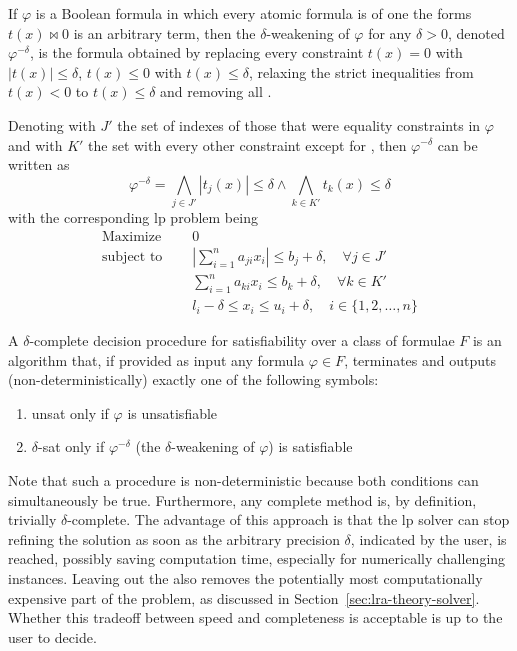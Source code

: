 \documentclass[runningheads]{llncs}
\begin{document}
\begin{definition}
    If $\varphi$ is a Boolean formula in which every atomic formula is of one the forms $t(x) \bowtie 0$ is an arbitrary term, then the $\delta$-weakening of $\varphi$ for any $\delta > 0$, denoted $\varphi^{-\delta}$, is the formula obtained by replacing every constraint $t(x) = 0$ with $|t(x)| \le \delta$, $t(x) \le 0$ with $t(x) \le \delta$, relaxing the strict inequalities from $t(x) < 0$ to $t(x) \le \delta$ and removing all \nqcs.
\end{definition}
Denoting with $J'$ the set of indexes of those that were equality constraints in $\varphi$ and with $K'$ the set with every other constraint except for \nqcs, then $\varphi^{-\delta}$ can be written as
\begin{equation*}
    \varphi^{-\delta} = \bigwedge_{j \in J'} |t_j(x)| \le \delta \wedge \bigwedge_{k \in K'} t_k(x) \le \delta
\end{equation*}
with the corresponding \gls{lp} problem being
\begin{equation}
    \label{eq:delta-lp}
    \begin{split}
        \text{Maximize }   \quad & 0                                                                                \\
        \text{subject to } \quad & \left|\sum_{i=1}^{n} a_{ji}x_{i}\right| \le b_j + \delta, \quad \forall j \in J' \\
        \quad                    & \sum_{i=1}^{n} a_{ki}x_{i} \le b_k + \delta, \quad \forall k \in K'              \\
        \quad                    & l_i - \delta \le x_i \le u_i + \delta,  \quad i \in \{1, 2, \ldots, n\}
    \end{split}
\end{equation}
\begin{definition}
    A $\delta$-complete decision procedure for satisfiability over a class of formulae $F$ is an algorithm that, if provided as input any formula $\varphi \in F$, terminates and outputs (non-deterministically) exactly one of the following symbols:
    \begin{enumerate}
        \item unsat only if $\varphi$ is unsatisfiable
        \item $\delta$-sat only if $\varphi^{-\delta}$ (the $\delta$-weakening of $\varphi$) is satisfiable
    \end{enumerate}
\end{definition}
Note that such a procedure is non-deterministic because both conditions can simultaneously be true.
Furthermore, any complete method is, by definition, trivially $\delta$-complete.
The advantage of this approach is that the \gls{lp} solver can stop refining the solution as soon as the arbitrary precision $\delta$, indicated by the user, is reached, possibly saving computation time, especially for numerically challenging instances.
Leaving out the \nqcs also removes the potentially most computationally expensive part of the problem, as discussed in Section~\ref{sec:lra-theory-solver}.
Whether this tradeoff between speed and completeness is acceptable is up to the user to decide.
\end{document}
